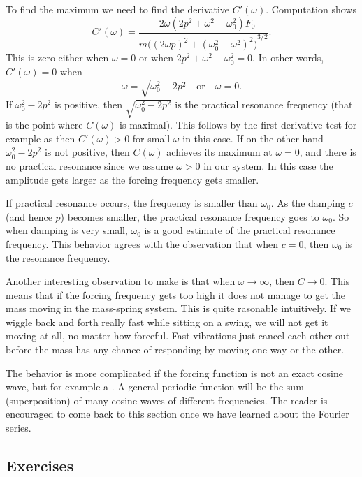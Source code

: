 To find the maximum we need to find the derivative $C'(\omega)$.
Computation shows
\begin{equation*}
C'(\omega) =
\frac{- 2\omega( 2p^2+\omega^2-\omega_0^2)F_0}
{m {\bigl({(2\omega p)}^2+{(\omega_0^2-\omega^2)}^2\bigr)}^{3/2}} .
\end{equation*}
This is zero either when $\omega = 0$ or when
$2p^2+\omega^2-\omega_0^2 = 0$.  In other words, $C'(\omega) = 0$ when
\begin{equation*}
\boxed{
~~
\omega = \sqrt{\omega_0^2 - 2p^2} \quad \text{or} \quad \omega = 0 .
~~
}
\end{equation*}
If $\omega_0^2 - 2p^2$ is positive, then
$\sqrt{\omega_0^2 - 2p^2}$ is the practical resonance frequency (that is the
point where $C(\omega)$ is maximal).  This follows by the first derivative
test for example as then $C'(\omega) > 0$ for small $\omega$ in this case.
If on the other hand $\omega_0^2 - 2p^2$ is not positive, then
$C(\omega)$ achieves its maximum at
$\omega=0$, and
there is no practical resonance since we assume $\omega > 0$
in our system.  In this case the amplitude gets larger as the forcing
frequency gets smaller.

If practical resonance occurs, the frequency is smaller than
$\omega_0$.  As the damping $c$ (and hence $p$) becomes smaller, the
practical resonance frequency
goes to $\omega_0$.  So when damping is very
small, $\omega_0$ is a good estimate of the practical resonance frequency.  This
behavior
agrees with the observation that when $c=0$, then $\omega_0$ is the resonance
frequency.

Another interesting observation to make is that when $\omega \to \infty$,
then $C \to 0$.  This means that if the forcing frequency gets too high it
does not manage to get the mass moving in the mass-spring system.  This is
quite rasonable intuitively.
If we wiggle back and forth really fast while sitting on a swing, we will
not get it moving at all, no matter how forceful.  Fast
vibrations just cancel each other out before the mass has any chance of
responding by moving one way or the other.

The behavior is more complicated if the forcing function is not an
exact cosine wave, but for example a .
A general periodic function will be the sum (superposition) of many
cosine waves of different frequencies.
The reader is encouraged to come
back to this section once we have learned about the Fourier series.

\subsection{Exercises}

